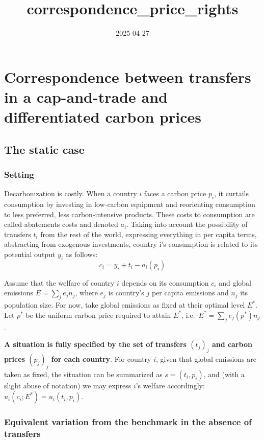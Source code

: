 \documentclass[
  letterpaper,
  DIV=11,
  numbers=noendperiod]{scrartcl}
\title{correspondence\_price\_rights}
\author{}
\date{2025-04-27}
\begin{document}
\maketitle


\section{Correspondence between transfers in a cap-and-trade and
differentiated carbon
prices}\label{correspondence-between-transfers-in-a-cap-and-trade-and-differentiated-carbon-prices}

\subsection{The static case}\label{the-static-case}

\subsubsection{Setting}\label{setting}

Decarbonization is costly. When a country \(i\) faces a carbon price
\(p_i\), it curtails consumption by investing in low-carbon equipment
and reorienting consumption to less preferred, less carbon-intensive
products. These costs to consumption are called abatements costs and
denoted \(a_i\). Taking into account the possibility of transfers
\(t_i\) from the rest of the world, expressing everything in per capita
terms, abstracting from exogenous investments, country i's consumption
is related to its potential output \(y_i\) as follows:
\[c_i = y_i + t_i - a_i(p_i)\]

Assume that the welfare of country \(i\) depends on its consumption
\(c_i\) and global emissions \(E=\sum_j e_j n_j\), where \(e_j\) is
country's \(j\) per capita emissions and \(n_j\) its population size.
For now, take global emissions as fixed at their optimal level \(E^*\).
Let \(p^*\) be the uniform carbon price required to attain \(E^*\),
i.e.~\(E^*=\sum_j e_j(p^*) n_j\).

\textbf{A situation is fully specified by the set of transfers
\((t_j)_j\) and carbon prices \((p_j)_j\) for each country}. For country
\(i\), given that global emissions are taken as fixed, the situation can
be summarized as \(s=(t_i, p_i)\), and (with a slight abuse of notation)
we may express \(i\)'s welfare accordingly:
\(u_i(c_i;E^*)=u_i(t_i,p_i)\).

\subsubsection{Equivalent variation from the benchmark in the absence of
transfers}\label{equivalent-variation-from-the-benchmark-in-the-absence-of-transfers}
\end{document}
